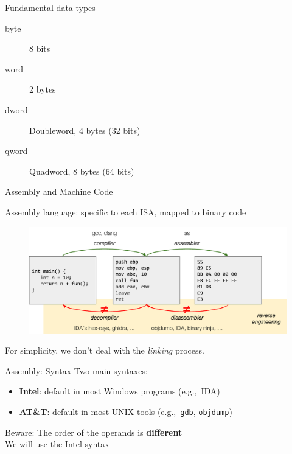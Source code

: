 \documentclass[]{beamer}
\begin{document}
 \begin{frame}{Fundamental data types}

 \begin{description}
	\item[byte] 8 bits
	\item[word] 2 bytes
	\item[dword] Doubleword, 4 bytes (32 bits)
	\item[qword] Quadword, 8 bytes (64 bits)
 \end{description}

 \end{frame}
 
 \begin{frame}{Assembly and Machine Code}
 
 Assembly language: specific to each ISA, mapped to binary code
 
 	\begin{figure}
    	\includegraphics[width=\linewidth]{images/asm-disasm}
  	\end{figure}
For simplicity, we don't deal with the \emph{linking} process.
 \end{frame}

\begin{frame}{Assembly: Syntax}
	Two main syntaxes:
	\begin{itemize}
		\item \textbf{Intel}: default in most Windows programs (e.g.,~IDA)
		\item \textbf{AT\&T}: default in most UNIX tools (e.g.,~{\tt gdb}, {\tt objdump})
	\end{itemize}
	Beware: The order of the operands is \textbf{different} \\[.5em]
	We will use the Intel syntax
\end{frame}
\end{document}
